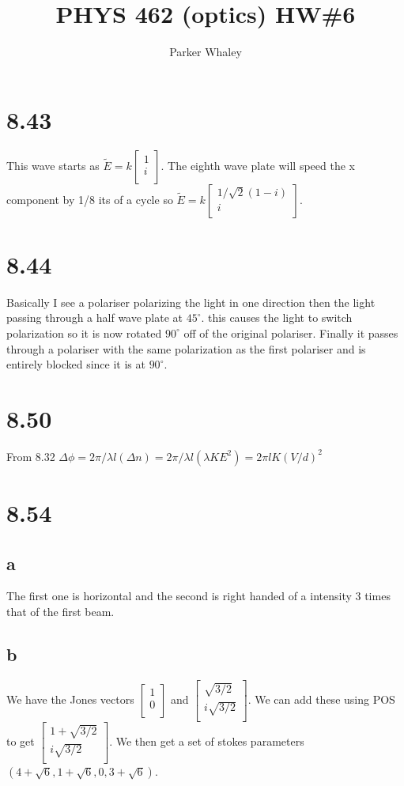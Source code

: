 \documentclass[12pt,a4paper]{article}
\author{Parker Whaley}
\title{PHYS 462 (optics) HW\#6}
\begin{document}
\maketitle
\section{8.43}
This wave starts as $\tilde{E}=k\begin{bmatrix} 1 \\ i \\ \end{bmatrix}$.  The eighth wave plate will speed the x component by 1/8 its of a cycle so $\tilde{E}=k\begin{bmatrix} 1/\sqrt{2}(1-i) \\ i \\ \end{bmatrix}$.
\section{8.44}
Basically I see a polariser polarizing the light in one direction then the light passing through a half wave plate at $45^\circ$.  this causes the light to switch polarization so it is now rotated $90^\circ$ off of the original polariser.  Finally it passes through a polariser with the same polarization as the first polariser and is entirely blocked since it is at $90^\circ$.
\section{8.50}
From 8.32 $\Delta \phi=2\pi/\lambda l(\Delta n)=2\pi/\lambda l(\lambda K E^2)=2\pi l K (V/d)^2$
\section{8.54}
\subsection{a}
The first one is horizontal and the second is right handed of a intensity 3 times that of the first beam.
\subsection{b}
We have the Jones vectors $\begin{bmatrix} 1 \\ 0 \\ \end{bmatrix}$ and $\begin{bmatrix} \sqrt{3/2} \\ i\sqrt{3/2} \\ \end{bmatrix}$.  We can add these using POS to get $\begin{bmatrix} 1+\sqrt{3/2} \\ i\sqrt{3/2} \\ \end{bmatrix}$.  We then get a set of stokes parameters $(4+\sqrt{6},1+\sqrt{6},0,3+\sqrt{6})$.
\end{document}
